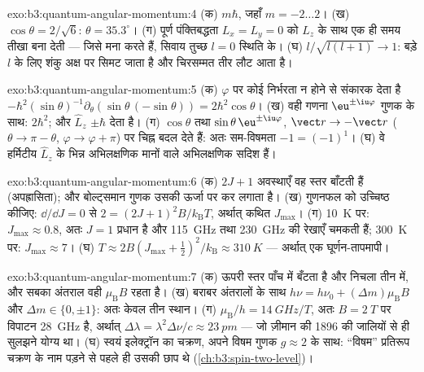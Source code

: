 \begin{solution}{exo:b3:quantum-angular-momentum:4}
(क) $m\hbar$, जहाँ $m = -2 \dots 2$। (ख) $\cos\theta = 2/\sqrt6$:
$\theta = 35.3^\circ$। (ग) पूर्ण पंक्तिबद्धता $L_x = L_y
= 0$ को $L_z$ के साथ एक ही समय तीखा बना देती --- जिसे 
मना करते हैं, सिवाय तुच्छ $l = 0$ स्थिति के। (घ) $l/\sqrt{l(l+1)} \to 1$:
बड़े $l$ के लिए शंकु अक्ष पर सिमट जाता है और चिरसम्मत तीर
लौट आता है।
\end{solution}

\begin{solution}{exo:b3:quantum-angular-momentum:5}
(क) $\varphi$ पर कोई निर्भरता न होने से संकारक देता है
$-\hbar^2(\sin\theta)^{-1}\partial_\theta(\sin\theta\,(-\sin\theta))
= 2\hbar^2\cos\theta$। (ख) वही गणना
$\eu^{\pm\iu\varphi}$ गुणक के साथ:  $2\hbar^2$; और $\hat L_z$
$\pm\hbar$ देता है। (ग) $\cos\theta$ तथा $\sin\theta\,\eu^{\pm\iu
\varphi}$, $\vect r \to -\vect r$ ($\theta \to \pi
- \theta$, $\varphi \to \varphi + \pi$) पर चिह्न बदल देते हैं:
अतः सम-विषमता $-1 = (-1)^1$। (घ)
वे हर्मिटीय $\hat L_z$ के भिन्न अभिलक्षणिक मानों वाले अभिलक्षणिक सदिश हैं।
\end{solution}

\begin{solution}{exo:b3:quantum-angular-momentum:6}
(क) $2J + 1$ अवस्थाएँ वह स्तर बाँटती हैं (अपह्रासिता); और बोल्ट्समान
गुणक उसकी ऊर्जा पर कर लगाता है। (ख) गुणनफल को उच्चिष्ठ कीजिए: $\dd/\dd J = 0$
से $2 = (2J+1)^2B/k_{\text{B}}T$, अर्थात् कथित $J_{\max}$। (ग)
\qty{10}{K} पर: $J_{\max} \approx 0.8$, अतः $J = 1$ प्रधान है और
\qty{115}{GHz} तथा \qty{230}{GHz} की रेखाएँ चमकती हैं; \qty{300}{K} पर:
$J_{\max} \approx 7$। (घ) $T \approx 2B(J_{\max} + \tfrac12)^2/
k_{\text{B}} \approx \qty{310}{K}$ --- अर्थात् एक घूर्णन-तापमापी।
\end{solution}

\begin{solution}{exo:b3:quantum-angular-momentum:7}
(क) ऊपरी स्तर पाँच में बँटता है और निचला तीन में, और सबका अंतराल वही
$\mu_{\text{B}}B$ रहता है। (ख) बराबर अंतरालों के साथ
$h\nu = h\nu_0 + (\Delta m)\mu_{\text{B}}B$ और $\Delta m \in \{0,
\pm1\}$: अतः केवल तीन स्थान। (ग) $\mu_{\text{B}}/h = \qty{14}{GHz/T}$, अतः $B = \qty{2}{T}$ पर
विपाटन \qty{28}{GHz} है, अर्थात् $\Delta\lambda =
\lambda^2\Delta\nu/c \approx \qty{23}{pm}$ --- जो ज़ीमान की 1896 की
जालियों से ही सुलझने योग्य था।
(घ) स्वयं इलेक्ट्रॉन का चक्रण, अपने विषम गुणक $g \approx
2$ के साथ: ``विषम'' प्रतिरूप चक्रण के नाम पड़ने से पहले ही उसकी छाप थे
(\cref{ch:b3:spin-two-level})।
\end{solution}

